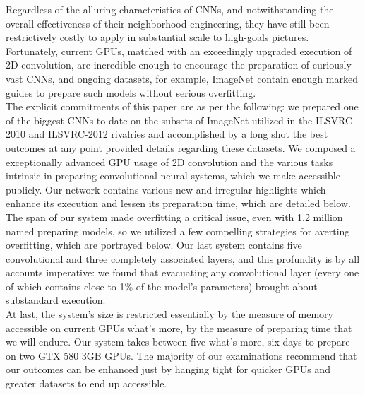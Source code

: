 \documentclass[12pt]{article}
\begin{document}
\hspace*{10mm}Regardless of the alluring characteristics of CNNs, and notwithstanding the overall effectiveness of their neighborhood engineering, they have still been restrictively costly to apply in substantial scale to high-goals pictures. Fortunately, current GPUs, matched with an exceedingly upgraded execution of 2D convolution, are incredible enough to encourage the preparation of curiously vast CNNs, and ongoing datasets, for example, ImageNet contain enough marked guides to prepare such models without serious overfitting. \\
\hspace*{10mm}The explicit commitments of this paper are as per the following: we prepared one of the biggest CNNs to date on the subsets of ImageNet utilized in the ILSVRC-2010 and ILSVRC-2012 rivalries and accomplished by a long shot the best outcomes at any point provided details regarding these datasets. We composed a exceptionally advanced GPU usage of 2D convolution and the various tasks intrinsic in preparing convolutional neural systems, which we make accessible publicly. Our network contains various new and irregular highlights which enhance its execution and lessen its preparation time, which are detailed below. The span of our system made overfitting a critical issue, even with 1.2 million named preparing models, so we utilized a few compelling strategies for averting overfitting, which are portrayed below. Our last system contains five convolutional and three completely associated layers, and this profundity is by all accounts imperative: we found that evacuating any convolutional layer (every one of which contains close to 1\% of the model's parameters) brought about substandard execution. \\
\hspace*{10mm}At last, the system's size is restricted essentially by the measure of memory accessible on current GPUs what's more, by the measure of preparing time that we will endure. Our system takes between five what's more, six days to prepare on two GTX 580 3GB GPUs. The majority of our examinations recommend that our outcomes can be enhanced just by hanging tight for quicker GPUs and greater datasets to end up accessible.

\end{document}
